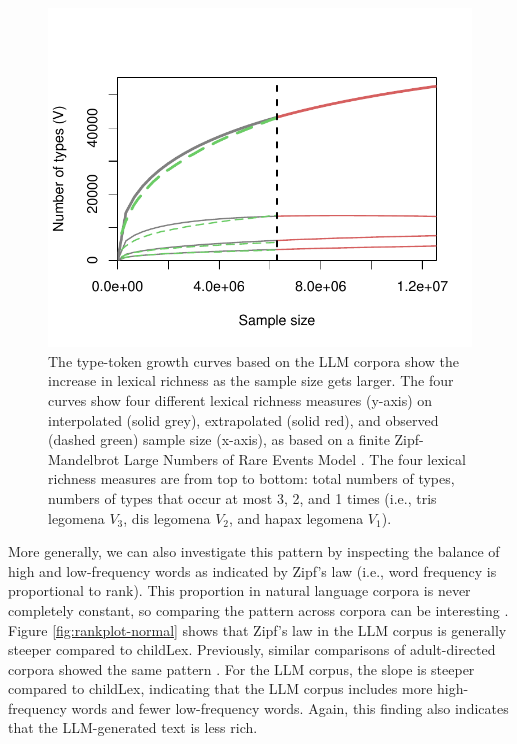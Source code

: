 \documentclass[doc, a4paper]{apa7}
\begin{document}
\begin{figure}[!htbp]
  \centering
    \includegraphics[scale=1]{figures/df.growth.intrextr-3.5.pdf}
    \caption{The type-token growth curves based on the LLM corpora show the increase in lexical richness as the sample size gets larger. The four curves show four different lexical richness measures (y-axis) on interpolated (solid grey), extrapolated (solid red), and observed (dashed green) sample size (x-axis), as based on a finite Zipf-Mandelbrot Large Numbers of Rare Events Model \citep[LNRE model, see][]{evert_simple_2004}. The four lexical richness measures are from top to bottom: total numbers of types, numbers of types that occur at most 3, 2, and 1 times (i.e., tris legomena $V_3$, dis legomena $V_2$, and hapax legomena $V_1$).}
    \label{fig:df.growth.intrextr}
  \hfill
\end{figure}


More generally, we can also investigate this pattern by inspecting the balance of high and low-frequency words as indicated by Zipf's law (i.e., word frequency is proportional to rank). This proportion in natural language corpora is never completely constant, so comparing the pattern across corpora can be interesting \citep[see, e.g., ][]{baayen_analyzing_2008, piantadosi_zipfs_2014, baayen_word_2001}. Figure \ref{fig:rankplot-normal} shows that Zipf's law in the LLM corpus is generally steeper compared to childLex. Previously, similar comparisons of adult-directed corpora showed the same pattern \citep[i.e., SubtLEX and Google Book corpus, ][]{brysbaert_impact_2016}. For the LLM corpus, the slope is steeper compared to childLex, indicating that the LLM corpus includes more high-frequency words and fewer low-frequency words. Again, this finding also indicates that the LLM-generated text is less rich.  
\end{document}
